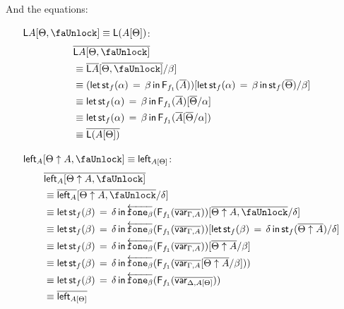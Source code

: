 \documentclass[10pt]{article}
\theoremstyle{definition}
\newcommand{\rewrite}[2]{\overleftarrow{#1}(#2)}
\newcommand\F[2]{\ensuremath{\mathsf{F}_{#1}(#2)}}
\newcommand\StI[2]{\ensuremath{\mathsf{st}_{#1}(#2)}}
\newcommand\StE[4]{\ensuremath{\mathsf{let} \, \StI{#1}{#3} \, = \, {#2} \, \mathsf{in} \, #4}}
\newcommand\FIs[2]{\ensuremath{\mathsf{F}_{#1}{(#2)}}}
\newcommand{\upstairs}[1]{\overline{#1}}
\newcommand\qvar[1]{\ensuremath{\mathsf{var}_{#1}}}
\newcommand\fone[1]{\ensuremath{\mathtt{fone}_{#1}}}
\newcommand{\lock}{\text{\faUnlock}}
\newcommand{\Ltype}[1]{\mathsf{L}{#1}}
\newcommand{\LI}[1]{\mathsf{left}_{#1}}
\begin{document}
And the equations:

\begin{enumerate}[style = multiline, labelwidth = 80pt]
\item[{$\Ltype{A}[\Theta, \lock] \equiv \Ltype{(A[\Theta])}$}:]
\begin{align*}
&\upstairs{\Ltype{A}[\Theta, \lock]} \\
&\equiv \upstairs{\Ltype{A}}[\upstairs{\Theta, \lock]}/\beta] \\
&\equiv (\StE{f}{\beta}{\alpha}{\F{f_1}{\upstairs{A}}})[\StE{f}{\beta}{\alpha}{\StI{f}{\upstairs{\Theta}}}/\beta] \\
&\equiv \StE{f}{\beta}{\alpha}{\F{f_1}{\upstairs{A}}[\upstairs{\Theta}/\alpha]} \\
&\equiv \StE{f}{\beta}{\alpha}{\F{f_1}{\upstairs{A}[\upstairs{\Theta}/\alpha]}} \\
&\equiv \upstairs{\Ltype{(A[\Theta])}}
\end{align*}

\item[{$\LI{A}[\Theta \uparrow A, \lock] \equiv \LI{A[\Theta]}$}:]
\begin{align*}
&\upstairs{\LI{A}[\Theta \uparrow A, \lock]} \\
&\equiv \upstairs{\LI{A}}[\upstairs{\Theta \uparrow A, \lock}/\delta] \\
&\equiv \StE{f}{\delta}{\beta}{\rewrite{\fone{\beta}}{\FIs{f_1}{\upstairs{\qvar{\Gamma, A}}}}}[\upstairs{\Theta \uparrow A, \lock}/\delta] \\
&\equiv \StE{f}{\delta}{\beta}{\rewrite{\fone{\beta}}{\FIs{f_1}{\upstairs{\qvar{\Gamma, A}}}}}[\StE{f}{\delta}{\beta}{\StI{f}{\upstairs{\Theta \uparrow A}}}/\delta] \\
&\equiv \StE{f}{\delta}{\beta}{\rewrite{\fone{\beta}}{\FIs{f_1}{\upstairs{\qvar{\Gamma, A}}}}[\upstairs{\Theta \uparrow A} / \beta]} \\
&\equiv \StE{f}{\delta}{\beta}{\rewrite{\fone{\beta}}{\FIs{f_1}{\upstairs{\qvar{\Gamma, A}}[\upstairs{\Theta \uparrow A} / \beta]}}} \\
&\equiv \StE{f}{\delta}{\beta}{\rewrite{\fone{\beta}}{\FIs{f_1}{\upstairs{\qvar{\Delta, A[\Theta]}}}}} \\
&\equiv \upstairs{\LI{A[\Theta]}}
\end{align*}


\end{enumerate}
\end{document}

